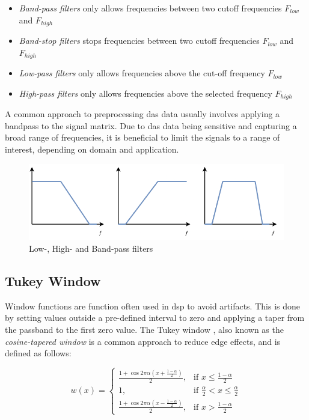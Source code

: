 \begin{itemize}
    \item \textit{Band-pass filters} only allows frequencies between two cutoff frequencies $F_{low}$ and $F_{high}$
    \item \textit{Band-stop filters} stops frequencies between two cutoff frequencies $F_{low}$ and $F_{high}$
    \item \textit{Low-pass filters} only allows frequencies above the cut-off frequency $F_{low}$
    \item \textit{High-pass filters} only allows frequencies above the selected frequency $F_{high}$
\end{itemize}

A common approach to preprocessing \acrshort{das} data usually involves applying a bandpass to the signal matrix. Due to \acrshort{das} data being sensitive and capturing a broad range of frequencies, it is beneficial to limit the signals to a range of interest, depending on domain and application.

\vspace{0.5cm}

\begin{figure}[!h]
    \centering
    \includegraphics[width=0.8\linewidth]{figures/lowhighpass.png}
    \caption{Low-, High- and Band-pass filters}
    \label{fig:rffilters}
\end{figure}


\subsection{Tukey Window}
\label{dsp:tukey}

Window functions are function often used in \acrshort{dsp} to avoid artifacts. This is done by setting values outside a pre-defined interval to zero and applying a taper from the passband to the first zero value. The Tukey window \cite{tukey1967introduction}, also known as the \textit{cosine-tapered window} is a common approach to reduce edge effects, and is defined as follows:

\[
    w(x)= 
\begin{cases}
    \frac{1 + \cos{2 \pi \alpha (x + \frac{1-\alpha}{2})}}{2}, & \text{if } x \leq \frac{1-\alpha}{2}\\
    1,              & \text{if } \frac{\alpha}{2} < x \leq \frac{\alpha}{2}\\
    \frac{1 + \cos{2 \pi \alpha (x - \frac{1-\alpha}{2})}}{2}, & \text{if } x > \frac{1-\alpha}{2}
\end{cases}
\]

